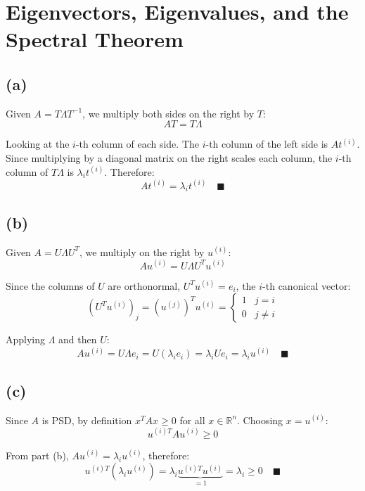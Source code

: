 \documentclass{article}
\begin{document}
\section{Eigenvectors, Eigenvalues, and the Spectral Theorem}

\subsection*{(a)}
Given $A = T\Lambda T^{-1}$, we multiply both sides on the right by $T$:
$$AT = T\Lambda$$

Looking at the $i$-th column of each side. The $i$-th column of 
the left side is $At^{(i)}$. Since multiplying by a diagonal matrix 
on the right scales each column, the $i$-th column of $T\Lambda$ is 
$\lambda_i t^{(i)}$. Therefore:
$$At^{(i)} = \lambda_i t^{(i)} \quad \blacksquare$$

\subsection*{(b)}
Given $A = U\Lambda U^T$, we multiply on the right by $u^{(i)}$:
$$Au^{(i)} = U\Lambda U^T u^{(i)}$$

Since the columns of $U$ are orthonormal, $U^Tu^{(i)} = e_i$, 
the $i$-th canonical vector:
$$(U^Tu^{(i)})_j = (u^{(j)})^T u^{(i)} = \begin{cases} 1 & j = i \\ 
0 & j \neq i \end{cases}$$

Applying $\Lambda$ and then $U$:
$$Au^{(i)} = U\Lambda e_i = U(\lambda_i e_i) = \lambda_i Ue_i = 
\lambda_i u^{(i)} \quad \blacksquare$$

\subsection*{(c)}
Since $A$ is PSD, by definition $x^TAx \geq 0$ for all 
$x \in \mathbb{R}^n$. Choosing $x = u^{(i)}$:
$$u^{(i)T}Au^{(i)} \geq 0$$

From part (b), $Au^{(i)} = \lambda_i u^{(i)}$, therefore:
$$u^{(i)T}(\lambda_i u^{(i)}) = \lambda_i \underbrace{u^{(i)T}
u^{(i)}}_{=1} = \lambda_i \geq 0 \quad \blacksquare$$
\end{document}
